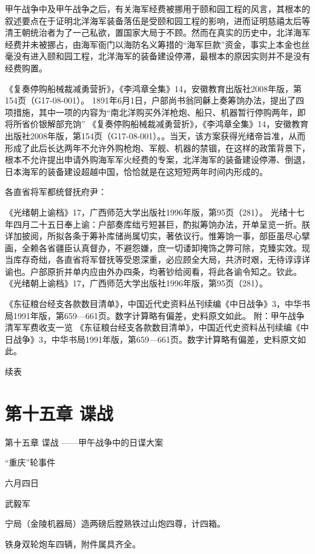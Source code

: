 \documentclass[12pt,UTF8]{ctexbook}
\begin{document}
甲午战争中及甲午战争之后，有关海军经费被挪用于颐和园工程的风言，其根本的叙述要点在于证明北洋海军装备落伍是受颐和园工程的影响，进而证明慈禧太后等清王朝统治者为了一己私欲，置国家大局于不顾。然而在真实的历史中，北洋海军经费并未被挪占，由海军衙门以海防名义筹措的“海军巨款”资金，事实上本金也丝毫没有进入颐和园工程，北洋海军的装备建设停滞，最根本的原因实则并不是没有经费购置。

《复奏停购船械裁减勇营折》，《李鸿章全集》14，安徽教育出版社2008年版，第154页（G17-08-001）。
1891年6月1日，户部尚书翁同龢上奏筹饷办法，提出了四项措施，其中一项的内容为“南北洋购买外洋枪炮、船只、机器暂行停购两年，即将所省价银解部充饷” 《复奏停购船械裁减勇营折》，《李鸿章全集》14，安徽教育出版社2008年版，第154页（G17-08-001）。。当天，该方案获得光绪帝旨准，从而形成了此后长达两年不允许外购枪炮、军舰、机器的禁锢，在这样的政策背景下，根本不允许提出申请外购海军军火经费的专案，北洋海军的装备建设停滞、倒退，日本海军的装备建设超越中国，恰恰就是在这短短两年时间内形成的。

各直省将军都统督抚府尹：

《光绪朝上谕档》17，广西师范大学出版社1996年版，第95页（281）。
光绪十七年四月二十五日奉上谕：户部奏库绌亏短甚巨，酌拟筹饷办法，开单呈览一折。朕详加披阅，所拟各条于筹补库储尚属切实，著依议行。惟筹饷一事，部臣虽尽心擘画，全赖各省疆臣认真督办，不避怨嫌，庶一切诿卸掩饰之弊可除，克臻实效。现当库存奇绌，各直省将军督抚等受恩深重，必应顾全大局，共济时艰，无待谆谆详谕也。户部原折并单内应由外办四条，均著钞给阅看，将此各谕令知之。钦此。 《光绪朝上谕档》17，广西师范大学出版社1996年版，第95页（281）。

《东征粮台经支各款数目清单》，中国近代史资料丛刊续编《中日战争》3，中华书局1991年版，第659—661页。数字计算略有偏差，史料原文如此。
附：甲午战争清军军费收支一览 《东征粮台经支各款数目清单》，中国近代史资料丛刊续编《中日战争》3，中华书局1991年版，第659—661页。数字计算略有偏差，史料原文如此。


续表


\chapter{第十五章 谍战}

第十五章
谍战
——甲午战争中的日谍大案

“重庆”轮事件

六月四日

武毅军

宁局（金陵机器局）造两磅后膛熟铁过山炮四尊，计四箱。

铁身双轮炮车四辆，附件属具齐全。
\end{document}

